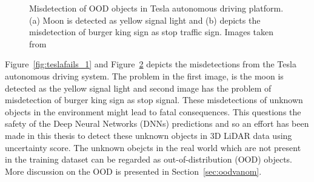 \begin{figure}[h!]
\begin{subfigure}{0.48\textwidth}
        \caption{}
        \label{fig:teslafails_2}
    \end{subfigure}
    \caption{Misdetection of OOD objects in Tesla autonomous driving platform. (a) Moon is detected as yellow signal light and (b) depicts the misdetection of burger king sign as stop traffic sign. Images taken from \cite{tesla_fails}}
\end{figure}

Figure~\ref{fig:teslafails_1} and Figure~\ref{fig:teslafails_2} depicts the misdetections from the Tesla autonomous driving system.
The problem in the first image, is the moon is detected as the yellow signal light and second image has the problem of misdetection of burger king sign as stop signal.
These misdetections of unknown objects in the environment might lead to fatal consequences.
This questions the safety of the Deep Neural Networks (DNNs) predictions and so an effort has been made in this thesis to detect these unknown objects in 3D LiDAR data using uncertainty score.
The unknown obejcts in the real world which are not present in the training dataset can be regarded as out-of-distribution (OOD) objects. 
More discussion on the OOD is presented in Section~\ref{sec:oodvanom}.

